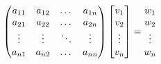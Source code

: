 \documentclass{article}
\begin{document}
\begin{equation*}
\begin{pmatrix}a_{11}&a_{12}&\dots&a_{1n}\\a_{21}&a_{22}&\dots&a_{2n}\\\vdots&\vdots&\ddots&\vdots\\a_{n1}&a_{n2}&\dots&a_{nn}\end{pmatrix}\notag
\begin{bmatrix}v_{1}\\v_{2}\\\vdots\\v_{n}\end{bmatrix}
\notag
=
\begin{matrix}w_{1}\\w_{2}\\\vdots\\w_{n}\end{matrix}
\notag
\end{equation*}%

\end{document}
